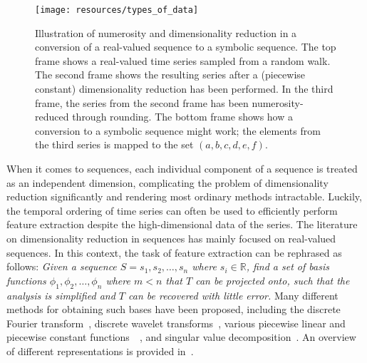 
\begin{figure}[htb]
  \begin{center}
    \leavevmode
    \texttt{[image: resources/types\_of\_data]}
  \end{center}
  \caption{\small{Illustration of numerosity and dimensionality reduction in a conversion of a real-valued sequence to a symbolic sequence. The top frame shows a real-valued time series sampled from a random walk. The second frame shows the resulting series after a (piecewise constant) dimensionality reduction has been performed. In the third frame, the series from the second frame has been numerosity-reduced through rounding. The bottom frame shows how a conversion to a symbolic sequence might work; the elements from the third series is mapped to the set $(a,b,c,d,e,f)$.}}
\label{fig:types_of_data}
\end{figure}

When it comes to sequences, each individual component of a sequence is treated as an independent dimension, complicating the problem of dimensionality reduction significantly and rendering most ordinary methods intractable. Luckily, the temporal ordering of time series can often be used to efficiently perform feature extraction despite the high-dimensional data of the series. The literature on dimensionality reduction in sequences has mainly focused on real-valued sequences. In this context, the task of feature extraction can be rephrased as follows: \emph{Given a sequence $S = s_1, s_2, \dots, s_n$ where $s_i \in \mathbb{R}$, find a set of basis functions $\phi_1, \phi_2, \dots, \phi_n$ where $m < n$ that $T$ can be projected onto, such that the analysis is simplified and $T$ can be recovered with little error.} Many different methods for obtaining such bases have been proposed, including the discrete Fourier transform~\cite{faloutsos1}, discrete wavelet transforms~\cite{pong}, various piecewise linear and piecewise constant functions~\cite{keogh3}~\cite{geurts}, and singular value decomposition~\cite{keogh3}. An overview of different representations is provided in~\cite{fabian}.

